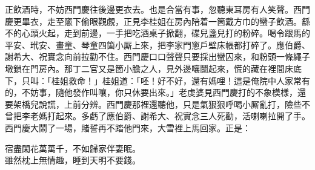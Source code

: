 正飲酒時，不妨西門慶往後邊更衣去。也是合當有事，忽聽東耳房有人笑聲。西門慶更畢衣，走至窻下偷眼觀覷，正見李桂姐在房內陪着一箇戴方巾的蠻子飲酒。{}繇不的心頭火起，走到前邊，一手把吃酒桌子掀翻，碟兒盞兒打的粉碎。喝令跟馬的平安、玳安、畫童、琴童四箇小厮上來，把李家門窻戶壁床帳都打碎了。應伯爵、謝希大、祝實念向前拉勸不住。西門慶口口聲聲只要採出蠻囚來，和粉頭一條繩子墩鎖在門房內。那丁二官又是箇小膽之人，見外邊嚷鬬起來，慌的藏在裡間床底下，只叫：「桂姐救命！」桂姐道：「呸！好不好，還有媽哩！這是俺院中人家常有的，不妨事，隨他發作叫嚷，你只休要出來。」老虔婆見西門慶打的不象模樣，還要架橋兒說謊，上前分辨。西門慶那裡還聽他，只是氣狠狠呼喝小厮亂打，險些不曾把李老媽打起來。多虧了應伯爵、謝希大、祝實念三人死勸，活喇喇拉開了手。西門慶大鬧了一場，賭誓再不踏他門來，大雪裡上馬回家。正是：

\begin{myquote} 
宿盡閑花萬萬千，不如歸家伴妻眠。\\雖然枕上無情趣，睡到天明不要錢。
\end{myquote} 

